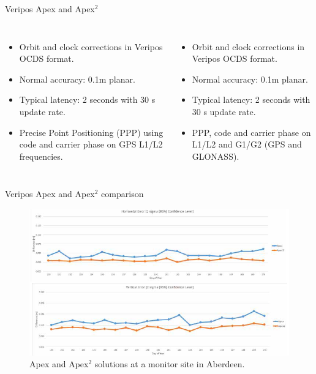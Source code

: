 \documentclass[11pt]{beamer}
\begin{document}
\begin{frame}{Veripos Apex and Apex$^2$}
	\begin{columns}[T,onlytextwidth]
		\begin{itemize}	
		\item Orbit and clock corrections in Veripos OCDS format.
		\item Normal accuracy: 0.1m planar. 
		\item Typical latency: 2 seconds with 30 s update rate.%
		\item Precise Point Positioning (PPP) using code and carrier phase on GPS L1/L2 frequencies.
		\end{itemize}	
		\begin{itemize}	
		\item Orbit and clock corrections in Veripos OCDS format.
		\item Normal accuracy: 0.1m planar. 
		\item Typical latency: 2 seconds with 30 s update rate.%
		\item PPP, code and carrier phase on L1/L2 and G1/G2 (GPS and GLONASS).
		\end{itemize}	
	\end{columns}
\end{frame}

\begin{frame}{Veripos Apex and Apex$^2$ comparison}
	\begin{figure}[T]
		\vspace*{-1cm}
		\includegraphics[height=0.7\textheight]{pic/Apex_compare.png}
		\caption{Apex and Apex$^2$ solutions at a monitor site in Aberdeen.}
	\end{figure}
\end{frame}
\end{document}
